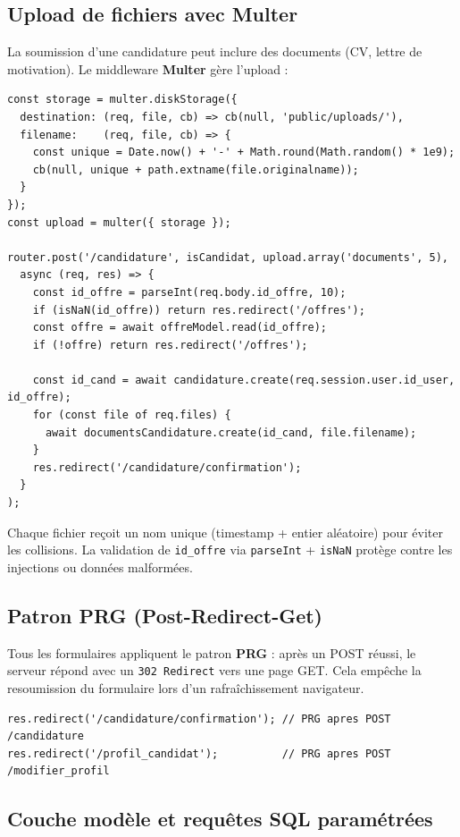 \documentclass[12pt,a4paper]{article}
\begin{document}
\subsection{Upload de fichiers avec Multer}

La soumission d'une candidature peut inclure des documents (CV, lettre de motivation). Le middleware \textbf{Multer} gère l'upload :

\begin{lstlisting}
const storage = multer.diskStorage({
  destination: (req, file, cb) => cb(null, 'public/uploads/'),
  filename:    (req, file, cb) => {
    const unique = Date.now() + '-' + Math.round(Math.random() * 1e9);
    cb(null, unique + path.extname(file.originalname));
  }
});
const upload = multer({ storage });

router.post('/candidature', isCandidat, upload.array('documents', 5),
  async (req, res) => {
    const id_offre = parseInt(req.body.id_offre, 10);
    if (isNaN(id_offre)) return res.redirect('/offres');
    const offre = await offreModel.read(id_offre);
    if (!offre) return res.redirect('/offres');

    const id_cand = await candidature.create(req.session.user.id_user, id_offre);
    for (const file of req.files) {
      await documentsCandidature.create(id_cand, file.filename);
    }
    res.redirect('/candidature/confirmation');
  }
);
\end{lstlisting}

Chaque fichier reçoit un nom unique (timestamp + entier aléatoire) pour éviter les collisions. La validation de \texttt{id\_offre} via \texttt{parseInt} + \texttt{isNaN} protège contre les injections ou données malformées.

\subsection{Patron PRG (Post-Redirect-Get)}

Tous les formulaires appliquent le patron \textbf{PRG} : après un POST réussi, le serveur répond avec un \texttt{302 Redirect} vers une page GET. Cela empêche la resoumission du formulaire lors d'un rafraîchissement navigateur.

\begin{lstlisting}
res.redirect('/candidature/confirmation'); // PRG apres POST /candidature
res.redirect('/profil_candidat');          // PRG apres POST /modifier_profil
\end{lstlisting}

\subsection{Couche modèle et requêtes SQL paramétrées}
\end{document}
